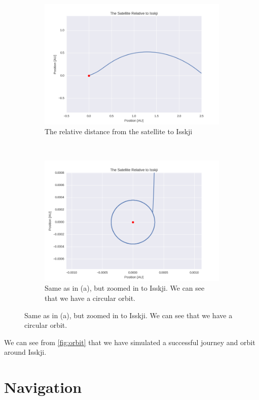 \documentclass[a4paper, 10pt]{article}
\begin{document}
\begin{figure}[H]\label{fig:orbit}
\centering
\begin{subfigure}[t]{0.5\textwidth}
\centering
\includegraphics[width=\textwidth]{part3relDist.png}
\caption{The relative distance from the satellite to Isskji}
\end{subfigure}%
~
\begin{subfigure}[t]{0.5\textwidth}
\centering
\includegraphics[width=\textwidth]{part3relDistClose.png}
\caption{Same as in (a), but zoomed in to Isskji. We can see that we have a circular orbit.}
\end{subfigure}%
\end{figure}

We can see from \ref{fig:orbit} that we have simulated a successful journey and orbit around Isskji.


\section{Navigation}
\end{document}
